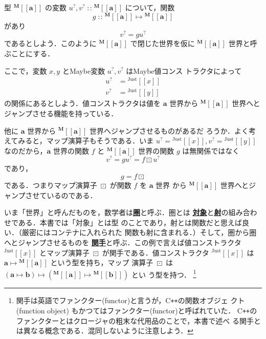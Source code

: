 \documentclass[a5paper,twoside,fleqn,draft]{jsbook}
\def\[{[\![}
\def\]{]\!]}
\newcommand{\programminglanguage}[1]{\textsf{#1}}
\newcommand{\cxx}{\programminglanguage{C}\texttt{++}}
\newcommand{\keyword}[1]{{\underline{\textbf{#1}}}}
\DeclareMathOperator{\mFuncArrow}{\mapsto}
\DeclareMathOperator{\mIn}{{:\!:}}
\DeclareMathOperator{\mMapMaybe}{\boxdot}
\newcommand{\mType}[1]{\mathbf{#1}} %
\newcommand{\mA}{\mType{a}}
\newcommand{\mB}{\mType{b}}
\newcommand{\mTypeAssemble}[2]{{}^\mType{#1}\[\mType{#2}\]}
\newcommand{\mMaybeType}[1]{\mTypeAssemble{M}{#1}}
\newcommand{\mValueConstructor}[1]{\mathrm{#1}}
\newcommand{\mValueWith}[2]{{}^\mValueConstructor{#1}\[#2\]}
\newcommand{\mJustWith}[1]{\mValueWith{Just}{#1}}
\newcommand{\mMaybe}[1]{{#1}^?}
\begin{document}
型 $\mMaybeType{a}$ の変数 $\mMaybe{u},\mMaybe{v}\mIn\mMaybeType{a}$
について，関数
\begin{equation}
  g
  \mIn\mMaybeType{a}\mFuncArrow\mMaybeType{a}
\end{equation}
があり
\begin{equation}
  \mMaybe{v}
  =g\mMaybe{u}
\end{equation}
であるとしよう．このように $\mMaybeType{a}$ で閉じた世界を仮に
$\mMaybeType{a}$ 世界と呼ぶことにする．

ここで，変数 $x,y$ とMaybe変数 $\mMaybe{u},\mMaybe{v}$ はMaybe値コンス
トラクタによって
\begin{align}
  \mMaybe{u}
  &=\mJustWith{x}\\
  \mMaybe{v}
  &=\mJustWith{y}
\end{align}
の関係にあるとしよう．値コンストラクタは値を $\mA$ 世界から
$\mMaybeType{a}$ 世界へとジャンプさせる機能を持っている．

他に $\mA$ 世界から $\mMaybeType{a}$ 世界へジャンプさせるものがあるだ
ろうか．よく考えてみると，マップ演算子もそうである．いま
$\mMaybe{u}=\mJustWith{x},\mMaybe{v}=\mJustWith{y}$ なのだから，$\mA $
世界の関数 $f$ と $\mMaybeType{a}$ 世界の関数 $g$ は無関係ではなく
\begin{equation}
  \mMaybe{v}
  =g\mMaybe{u}
  =f\mMapMaybe\mMaybe{u}
\end{equation}
であり，
\begin{equation}
  g
  =f\mMapMaybe
\end{equation}
である．つまりマップ演算子 $\mMapMaybe$ が関数 $f$ を $\mA$ 世界
から $\mMaybeType{a}$ 世界へとジャンプさせているのである．

いま「世界」と呼んだものを，数学者は\keyword{圏}と呼ぶ．圏とは
\keyword{対象}と\keyword{射}の組み合わせである．本書では「対象」とは型
のことであり，射とは関数だと思えば良い．（厳密にはコンテナに入れられた
  関数も射に含まれる．）そして，圏から圏へとジャンプさせるものを
\keyword{関手}と呼ぶ．この例で言えば値コンストラクタ $\mJustWith{x}$
とマップ演算子 $\mMapMaybe$ が関手である．値コンストラクタ
$\mJustWith{x}$ は $\mA\mFuncArrow\mMaybeType{a}$ という型を持ち，マップ
演算子 $\mMapMaybe$ は
$(\mA\mFuncArrow\mB)\mFuncArrow(\mMaybeType{a}\mFuncArrow\mMaybeType{b})$ とい
う型を持つ．
\footnote{関手は英語でファンクター(functor)と言うが，\cxx の関数オブジェ
  クト (function object) もかつてはファンクター(functor)と呼ばれていた．
  \cxx のファンクターとはクロージャの粗末な代用品のことで，本書で述べ
  る関手とは異なる概念である．混同しないように注意しよう．}
\end{document}
